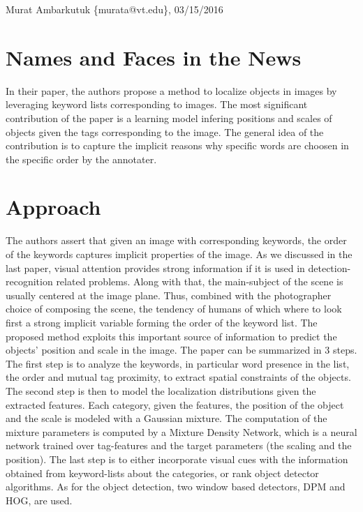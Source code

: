 \documentclass[11pt]{article}
\begin{document}
\thispagestyle{empty}
\begin{flushright}
	\small{Murat Ambarkutuk \{murata@vt.edu\}, 03/15/2016}
\end{flushright}
\section{Names and Faces in the News}
In their paper, the authors propose a method to localize objects in images by leveraging keyword lists corresponding to images.
The most significant contribution of the paper is a learning model infering positions and scales of objects given the tags corresponding to the image.
The general idea of the contribution is to capture the implicit reasons why specific words are choosen in the specific order by the annotater.
\section{Approach}
\indent The authors assert that given an image with corresponding keywords, the order of the keywords captures implicit properties of the image.
As we discussed in the last paper, visual attention provides strong information if it is used in detection-recognition related problems.
Along with that, the main-subject of the scene is usually centered at the image plane.
Thus, combined with the photographer choice of composing the scene, the tendency of humans of which where to look first a strong implicit variable forming the order of the keyword list.
The proposed method exploits this important source of information to predict the objects' position and scale in the image.
The paper can be summarized in 3 steps.
The first step is to analyze the keywords, in particular word presence in the list, the order and mutual tag proximity, to extract spatial constraints of the objects.
The second step is then to model the localization distributions given the extracted features.
Each category, given the features, the position of the object and the scale is modeled with a Gaussian mixture.
The computation of the mixture parameters is computed by a Mixture Density Network, which is a neural network trained over tag-features and the target parameters (the scaling and the position).
The last step is to either incorporate visual cues with the information obtained from keyword-lists about the categories, or rank object detector algorithms.
As for the object detection, two window based detectors, DPM and HOG, are used.
\end{document}
